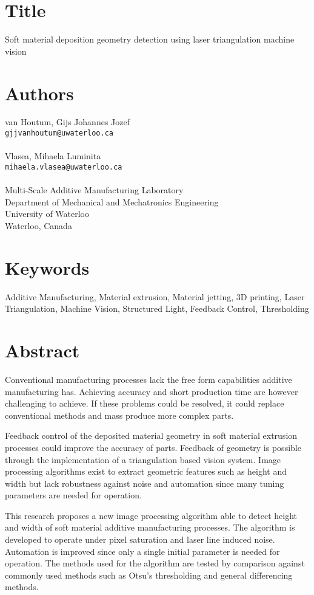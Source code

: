 \documentclass[10pt,letter]{article}
\begin{document}
\section*{Title}
Soft material deposition geometry detection using laser triangulation machine vision

\section*{Authors}
van Houtum, Gijs Johannes Jozef \\ 
\texttt{gjjvanhoutum@uwaterloo.ca} \\
\\
Vlasea, Mihaela Luminita\\
\texttt{mihaela.vlasea@uwaterloo.ca} \\
\\
Multi-Scale Additive Manufacturing Laboratory \\
Department of Mechanical and Mechatronics Engineering \\
University of Waterloo \\
Waterloo, Canada 

\section*{Keywords}
Additive Manufacturing, Material extrusion, Material jetting, 3D printing, Laser Triangulation, Machine Vision, Structured Light, Feedback Control, Thresholding 

\section*{Abstract}
Conventional manufacturing processes lack the free form capabilities additive manufacturing has. Achieving accuracy and short production time are however challenging to achieve. If these problems could be resolved, it could replace conventional methods and mass produce more complex parts.

Feedback control of the deposited material geometry in soft material extrusion processes could improve the accuracy of parts. Feedback of geometry is possible through the implementation of a triangulation based vision system. Image processing algorithms exist to extract geometric features such as height and width but lack robustness against noise and automation since many tuning parameters are needed for operation. 
 
This research proposes a new image processing algorithm able to detect height and width of soft material additive manufacturing processes. The algorithm is developed to operate under pixel saturation and laser line induced noise. Automation is improved since only a single initial parameter is needed for operation.
The methods used for the algorithm are tested by comparison against commonly used methods such as Otsu's thresholding and general differencing methods.
\end{document}
